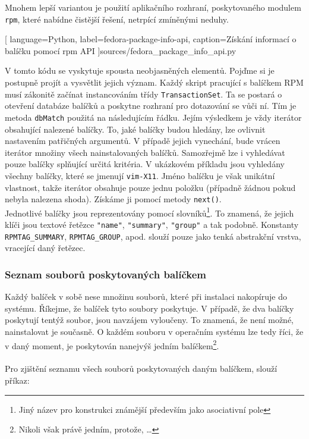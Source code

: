 \documentclass[
  field=inf,
  biblatex,
  glossaries,
  index
]{kidiplom}
\begin{document}
		Mnohem lepší variantou je použití aplikačního rozhraní, poskytovaného modulem \texttt{rpm}, které nabídne čistější řešení, netrpící zmíněnými neduhy.

		\newpage
		
		[
			language=Python,
			label=fedora-package-info-api,
			caption={Získání informací o balíčku pomocí rpm API}
		]{sources/fedora_package_info_api.py}

		V tomto kódu se vyskytuje spousta neobjasněných elementů. Pojďme si je postupně projít a vysvětlit jejich význam. Každý skript pracující s balíčkem RPM musí zákonitě začínat instancováním třídy \texttt{TransactionSet}. Ta se postará o otevření databáze balíčků a poskytne rozhraní pro dotazování se vůči ní. Tím je metoda \texttt{dbMatch} použitá na následujícím řádku. Jejím výsledkem je vždy iterátor obsahující nalezené balíčky. To, jaké balíčky budou hledány, lze ovlivnit nastavením patřičných argumentů. V případě jejich vynechání, bude vrácen iterátor množiny všech nainstalovaných balíčků. Samozřejmě lze i vyhledávat pouze balíčky splňující určitá kritéria. V ukázkovém příkladu jsou vyhledány všechny balíčky, které se jmenují \texttt{vim-X11}. Jméno balíčku je však unikátní vlastnost, takže iterátor obsahuje pouze jednu položku (případně žádnou pokud nebyla nalezena shoda). Získáme ji pomocí metody \texttt{next()}.
		\\
		Jednotlivé balíčky jsou reprezentovány pomocí slovníků\footnote{Jiný název pro konstrukci známější především jako asociativní pole}. To znamená, že jejich klíči jsou textové řetězce \texttt{"name"}, \texttt{"summary"}, \texttt{"group"} a tak podobně. Konstanty \texttt{RPMTAG\_SUMMARY}, \texttt{RPMTAG\_GROUP}, apod. slouží pouze jako tenká abstrakční vrstva, vracející daný řetězec.

		\subsubsection{Seznam souborů poskytovaných balíčkem}
		Každý balíček v sobě nese množinu souborů, které při instalaci nakopíruje do systému. Říkejme, že balíček tyto soubory poskytuje. V případě, že dva balíčky poskytují tentýž soubor, jsou navzájem vyloučeny. To znamená, že není možné, nainstalovat je současně. O každém souboru v operačním systému lze tedy říci, že v daný moment, je poskytován nanejvýš jedním balíčkem\footnote{Nikoli však právě jedním, protože, \dots}.
		\\
		\\
		Pro zjištění seznamu všech souborů poskytovaných daným balíčkem, slouží příkaz:
\end{document}
